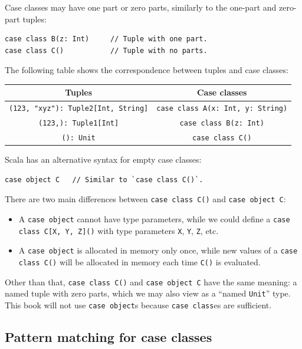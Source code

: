 Case classes may have one part or zero parts, similarly to the one-part
and zero-part tuples:
\begin{lstlisting}
case class B(z: Int)     // Tuple with one part.
case class C()           // Tuple with no parts.
\end{lstlisting}

The following table shows the correspondence between tuples and case
classes:
\begin{center}
\begin{tabular}{|c|c|}
\hline 
\textbf{\small{}Tuples} & \textbf{\small{}Case classes}\tabularnewline
\hline 
\hline 
{\small{}}\lstinline!(123, "xyz"): Tuple2[Int, String]! & {\small{}}\lstinline!case class A(x: Int, y: String)!\tabularnewline
\hline 
{\small{}}\lstinline!(123,): Tuple1[Int]! & {\small{}}\lstinline!case class B(z: Int)!\tabularnewline
\hline 
{\small{}}\lstinline!(): Unit! & {\small{}}\lstinline!case class C()!\tabularnewline
\hline 
\end{tabular}
\par\end{center}

Scala has an alternative syntax for empty case classes:
\begin{lstlisting}
case object C   // Similar to `case class C()`.
\end{lstlisting}
There are two main differences between \lstinline!case class C()!
and \lstinline!case object C!:
\begin{itemize}
\item A \lstinline!case object! cannot have type parameters, while we could
define a \lstinline!case class C[X, Y, Z]()! with type parameters
\lstinline!X!, \lstinline!Y!, \lstinline!Z!, etc.
\item A \lstinline!case object! is allocated in memory only once, while
new values of a \lstinline!case class C()! will be allocated in memory
each time \lstinline!C()! is evaluated.
\end{itemize}
Other than that, \lstinline!case class C()! and \lstinline!case object C!
have the same meaning: a named tuple with zero parts, which we may
also view as a \textsf{``}named \lstinline!Unit!\textsf{''}
type. This book will not use \lstinline!case object!s because \lstinline!case class!es
are sufficient.

\subsection{Pattern matching for case classes}

